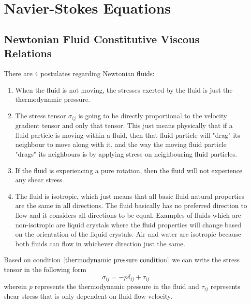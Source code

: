 \chapter{Navier-Stokes Equations}


\section{Newtonian Fluid Constitutive Viscous Relations}
\begin{comment}
\end{comment}
There are $4$ postulates regarding Newtonian fluids:
\begin{enumerate}
\item When the fluid is not moving, the stresses exerted by the fluid is just the thermodynamic pressure.\label{thermodynamic pressure condition}
\item The stress tensor $\sigma_{ij}$ is going to be directly proportional to the velocity gradient tensor and only that tensor.
This just means physically that if a fluid particle is moving within a fluid, then that fluid particle will "drag" its neighbour to move along with it, and the way the moving fluid particle "drags" its neighbours is by applying stress on neighbouring fluid particles. \label{stress tensor directly proportional to velocity gradient}
\item If the fluid is experiencing a pure rotation, then the fluid will not experience any shear stress. \label{pure rotation no shear stress}
\item The fluid is isotropic, which just means that all basic fluid natural properties are the same in all directions. 
The fluid basically has no preferred direction to flow and it considers all directions to be equal.
Examples of fluids which are non-isotropic are liquid crystals where the fluid properties will change based on the orientation of the liquid crystals.
Air and water are isotropic because both fluids can flow in whichever direction just the same. \label{isotropy condition fluid shear stress}
\end{enumerate}
Based on condition $\ref{thermodynamic pressure condition}$ we can write the stress tensor in the following form
\begin{equation}\sigma_{ij} = -p\delta_{ij} + \tau_{ij} \label{Stress Tensor Constitutive Relation Fluid Momentum}\end{equation}
wherein $p$ represents the thermodynamic pressure in the fluid and $\tau_{ij}$ represents shear stress that is only dependent on fluid flow velocity.
